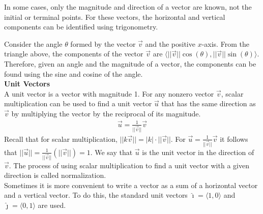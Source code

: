 \documentclass[a4paper]{article}
\let\bf\textbf
\let\la\langle
\let\ra\rangle
\newcommand{\ih}{\hat{\imath}}
\newcommand{\jh}{\hat{\jmath}}
\begin{document}
\newpage\noindent
In some cases, only the magnitude and direction of a vector are known, not the initial or terminal points. For these vectors, the horizontal and vertical components can be identified using trigonometry.
\begin{center}
\end{center}
Consider the angle $\theta$ formed by the vector $\vec{v}$ and the positive $x$-axis. From the triangle above, the components of the vector $\vec{v}$ are $\la ||\vec{v}||\cos(\theta),||\vec{v}||\sin(\theta) \ra$. Therefore, given an angle and the magnitude of a vector, the components can be found using the sine and cosine of the angle.
\vspace{2mm}\\
\bf{Unit Vectors}
\vspace{2mm}\\
A unit vector is a vector with magnitude 1. For any nonzero vector $\vec{v}$, scalar multiplication can be used to find a unit vector $\vec{u}$ that has the same direction as $\vec{v}$ by multiplying the vector by the reciprocal of its magnitude.
\begin{align*}
    \vec{u} = \frac{1}{||\vec{v}||}\vec{v}
\end{align*} 
Recall that for scalar multiplication, $||k\vec{v}|| = |k| \cdot ||\vec{v}||$. For $\vec{u} = \frac{1}{||\vec{v}||}\vec{v}$ it follows that $||\vec{u}|| = \frac{1}{||\vec{v}||}(||\vec{v}||) = 1$. We say that $\vec{u}$ is the unit vector in the direction of $\vec{v}$. The process of using scalar multiplication to find a unit vector with a given direction is called normalization.
\vspace{1mm}\\
Sometimes it is more convenient to write a vector as a sum of a horizontal vector and a vertical vector. To do this, the standard unit vectors $\ih = \la 1, 0 \ra$ and $\jh = \la 0, 1 \ra$ are used.
\begin{center}
\end{center}
\end{document}
